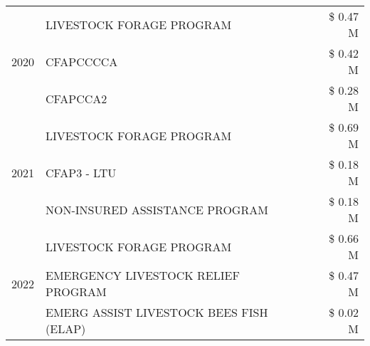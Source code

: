 \begin{tabular}{llr}
\cline{1-3}
\multirow[t]{3}{*}{2020} & LIVESTOCK FORAGE PROGRAM & \$ 0.47 M \\
 & CFAPCCCCA & \$ 0.42 M \\
 & CFAPCCA2 & \$ 0.28 M \\
\cline{1-3}
\multirow[t]{3}{*}{2021} & LIVESTOCK FORAGE PROGRAM & \$ 0.69 M \\
 & CFAP3 - LTU & \$ 0.18 M \\
 & NON-INSURED ASSISTANCE PROGRAM & \$ 0.18 M \\
\cline{1-3}
\multirow[t]{3}{*}{2022} & LIVESTOCK FORAGE PROGRAM & \$ 0.66 M \\
 & EMERGENCY LIVESTOCK RELIEF PROGRAM & \$ 0.47 M \\
 & EMERG ASSIST LIVESTOCK BEES FISH (ELAP) & \$ 0.02 M \\
\cline{1-3}
\bottomrule
\end{tabular}
